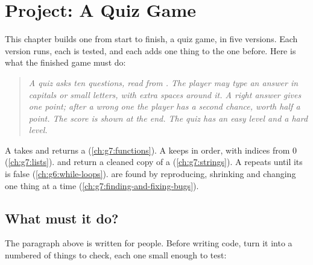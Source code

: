 \chapter{Project: A Quiz Game}\label{ch:g7:project-quiz-game}

This chapter builds one  from start to finish, a quiz game, in five
versions. Each version runs, each is tested, and each adds one thing to the
one before. Here is what the finished game must do:

\begin{quote}
\itshape A quiz asks ten questions, read from . The player may type an
answer in capitals or small letters, with extra spaces around it. A right
answer gives one point; after a wrong one the player has a second chance,
worth half a point. The score is shown at the end. The quiz has an easy level
and a hard level.
\end{quote}

\begin{recall}
A  takes  and returns a  (\cref{ch:g7:functions}). A
 keeps  in order, with indices from 0 (\cref{ch:g7:lists}).
 and  return a cleaned copy of a 
(\cref{ch:g7:strings}). A   repeats until its  is
false (\cref{ch:g6:while-loops}).  are found by reproducing, shrinking and
changing one thing at a time (\cref{ch:g7:finding-and-fixing-bugs}).
\end{recall}

\section{What must it do?}

The paragraph above is written for people. Before writing code, turn it into
a numbered  of things to check, each one small enough to test:

